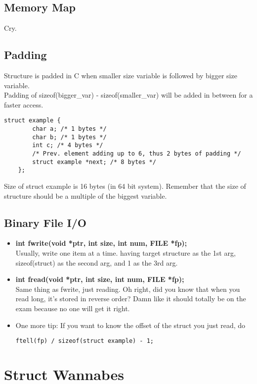 \documentclass{article}
\begin{document}
\subsection{Memory Map}
Cry.

\subsection{Padding}
Structure is padded in C when smaller size variable is followed by bigger size variable.\\
Padding of sizeof(bigger\_var) - sizeof(smaller\_var) will be added in between for a faster access.
\begin{lstlisting}[style=CStyle]
    struct example {
        char a; /* 1 bytes */
        char b; /* 1 bytes */
        int c; /* 4 bytes */
        /* Prev. element adding up to 6, thus 2 bytes of padding */
        struct example *next; /* 8 bytes */
    };
\end{lstlisting}
Size of struct example is 16 bytes (in 64 bit system). Remember that the size of structure should be a multiple of the biggest variable.

\subsection{Binary File I/O}
\begin{itemize}
    \item \textbf{int fwrite(void *ptr, int size, int num, FILE *fp);}\\
    Usually, write one item at a time. having target structure as the 1st arg, sizeof(struct) as the second arg, and 1 as the 3rd arg.
    \item \textbf{int fread(void *ptr, int size, int num, FILE *fp);}\\
    Same thing as fwrite, just reading. Oh right, did you know that when you read long, it's stored in reverse order? Damn like it should totally be on the exam because no one will get it right.
    \item One more tip: If you want to know the offset of the struct you just read, do
    \begin{lstlisting}[style=CStyle]
        ftell(fp) / sizeof(struct example) - 1;
    \end{lstlisting}
\end{itemize}

\section{Struct Wannabes}
\end{document}
